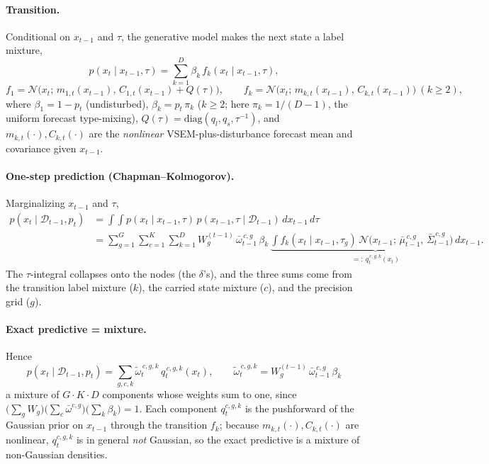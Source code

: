 \documentclass{article}
\newcommand{\Norm}{\mathcal{N}}
\begin{document}
\paragraph{Transition.} Conditional on $x_{t-1}$ and $\tau$, the generative model makes the
next state a label mixture,
\[
  p(x_t \mid x_{t-1}, \tau) = \sum_{k=1}^{D} \beta_k\, f_k(x_t \mid x_{t-1}, \tau),
\]
\[
  f_1 = \Norm\!\big(x_t;\, m_{1,t}(x_{t-1}),\, C_{1,t}(x_{t-1}) + Q(\tau)\big),
  \qquad
  f_k = \Norm\!\big(x_t;\, m_{k,t}(x_{t-1}),\, C_{k,t}(x_{t-1})\big)\ (k \ge 2),
\]
where $\beta_1 = 1-p_t$ (undisturbed), $\beta_k = p_t\,\pi_k$ ($k\ge2$; here
$\pi_k = 1/(D-1)$, the uniform forecast type-mixing), $Q(\tau)=\mathrm{diag}(q_l,q_s,\tau^{-1})$,
and $m_{k,t}(\cdot), C_{k,t}(\cdot)$ are the \emph{nonlinear} VSEM-plus-disturbance forecast
mean and covariance given $x_{t-1}$.

\paragraph{One-step prediction (Chapman--Kolmogorov).} Marginalizing $x_{t-1}$ and $\tau$,
\begin{align*}
  p(x_t \mid \mathcal{D}_{t-1}, p_t)
  &= \int\!\!\int p(x_t \mid x_{t-1}, \tau)\, p(x_{t-1}, \tau \mid \mathcal{D}_{t-1})\, dx_{t-1}\, d\tau \\
  &= \sum_{g=1}^{G} \sum_{c=1}^{K} \sum_{k=1}^{D}
     W^{(t-1)}_g\, \bar\omega^{\,c,g}_{t-1}\, \beta_k \,
     \underbrace{\int f_k(x_t \mid x_{t-1}, \tau_g)\,
       \Norm\!\big(x_{t-1};\, \bar\mu^{\,c,g}_{t-1},\, \bar\Sigma^{\,c,g}_{t-1}\big)\, dx_{t-1}}_{=:\ q^{\,c,g,k}_t(x_t)} .
\end{align*}
The $\tau$-integral collapses onto the nodes (the $\delta$'s), and the three sums come from
the transition label mixture ($k$), the carried state mixture ($c$), and the precision grid
($g$).

\paragraph{Exact predictive = mixture.} Hence
\[
  \boxed{\;
  p(x_t \mid \mathcal{D}_{t-1}, p_t)
  = \sum_{g,c,k} \tilde\omega^{\,c,g,k}_t\, q^{\,c,g,k}_t(x_t),
  \qquad
  \tilde\omega^{\,c,g,k}_t = W^{(t-1)}_g\, \bar\omega^{\,c,g}_{t-1}\, \beta_k \;}
\]
a mixture of $G\cdot K\cdot D$ components whose weights sum to one, since
$\big(\sum_g W_g\big)\big(\sum_c \bar\omega^{c,g}\big)\big(\sum_k \beta_k\big) = 1$. Each
component $q^{c,g,k}_t$ is the pushforward of the Gaussian prior on $x_{t-1}$ through the
transition $f_k$; because $m_{k,t}(\cdot), C_{k,t}(\cdot)$ are nonlinear, $q^{c,g,k}_t$ is in
general \emph{not} Gaussian, so the exact predictive is a mixture of non-Gaussian densities.
\end{document}
